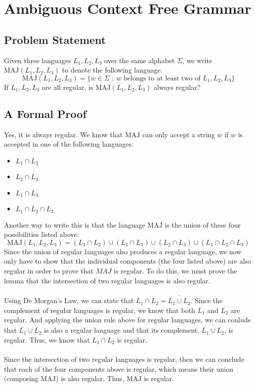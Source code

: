 \section{Ambiguous Context Free Grammar}
\subsection{Problem Statement}
Given three languages $L_1, L_2, L_3$ over the same alphabet $\Sigma$, we write $\text{MAJ}(L_1, L_2, L_3)$ to denote the following language.
$$
\text{MAJ}(L_1, L_2, L_3) = \{w \in \Sigma \;:\; w \text{ belongs to at least two of } L_1, L_2, L_3 \}
$$
If $L_1, L_2, L_3$ are all regular, is $\text{MAJ}(L_1, L_2, L_3)$ always regular?
\subsection{A Formal Proof}
Yes, it is always regular. We know that $\text{MAJ}$ can only accept a string $w$ if $w$ is accepted in one of the following languages:
\begin{itemize}
    \item $L_1 \cap L_2$
    \item $L_2 \cap L_3$
    \item $L_1 \cap L_3$
    \item $L_1 \cap L_2 \cap L_3$
\end{itemize}
Another way to write this is that the language $\text{MAJ}$ is the union of these four possibilities listed above:
$$
\text{MAJ}(L_1,L_2,L_3) = (L_1 \cap L_2) \cup (L_1 \cap L_3) \cup (L_2 \cap L_3) \cup (L_1 \cap L_2 \cap L_3)
$$
Since the union of regular languages also produces a regular language, we now only have to show that the individual components (the four listed above) are also regular in order to prove that $MAJ$ is regular. 
To do this, we must prove the lemma that the intersection of two regular languages is also regular.\\
\\
Using De Morgan's Law, we can state that $L_1 \cap L_2 = \overline{\overline{L_1} \cup \overline{L_2}}$. Since the complement of regular languages is regular, we know that both $\overline{L_1}$ and $\overline{L_2}$ are regular. And applying the union rule above for regular languages, we can conlude that $\overline{L_1} \cup \overline{L_2}$ is also a regular language and that its complement, $\overline{\overline{L_1} \cup \overline{L_2}}$, is regular.  Thus, we know that $L_1 \cap L_2$ is regular. \\
\\
Since the intersection of two regular languages is regular, then we can conclude that each of the four components above is regular, which means their union (composing $\text{MAJ}$) is also regular. Thus, $\text{MAJ}$ is regular.